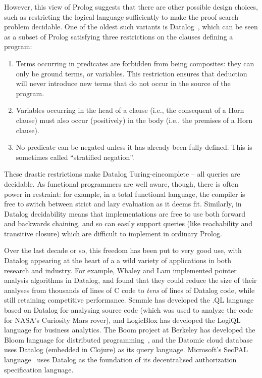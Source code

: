 However, this view of Prolog suggests that there are other possible
design choices, such as restricting the logical language sufficiently
to make the proof search problem decidable. One of the oldest such
variants is Datalog~\cite{datalog}, which can be seen as a subset of
Prolog satisfying three restrictions on the clauses defining a program:
\begin{enumerate}
\item Terms occurring in predicates are forbidden from being
  composites: they can only be ground terms, or variables. This
  restriction ensures that deduction will never introduce new terms
  that do not occur in the source of the program.
\item Variables occurring in the head of a clause (i.e., the
  consequent of a Horn clause) must also occur (positively) in the
  body (i.e., the premises of a Horn clause).
\item No predicate can be negated unless it has already been fully
  defined.  This is sometimes called ``stratified negation''.
\end{enumerate}
These drastic restrictions make Datalog Turing-eincomplete -- all
queries are decidable. As functional programmers are well aware,
though, there is often power in restraint: for example, in a total
functional language, the compiler is free to switch between strict and
lazy evaluation as it deems fit. Similarly, in Datalog decidability
means that implementations are free to use both forward and backwards
chaining, and so can easily support queries (like reachability and
transitive closure) which are difficult to implement in ordinary
Prolog.

Over the last decade or so, this freedom has been put to very good
use, with Datalog appearing at the heart of a a wild variety of
applications in both research and industry.  For example, Whaley and
Lam \cite{whaley-lam,whaley-phd} implemented pointer analysis
algorithms in Datalog, and found that they could reduce the size of
their analyses from thousands of lines of C code to \emph{tens} of
lines of Datalog code, while still retaining competitive
performance. Semmle has developed the .QL
language~\cite{semmlecode,ql-inference} based on Datalog for analysing
source code (which was used to analyze the code for NASA's Curiosity
Mars rover), and LogicBlox has developed the LogiQL~\cite{logicblox}
language for business analytics. The Boom project at Berkeley has
developed the Bloom language for distributed programming~\cite{bloom},
and the Datomic cloud database~\cite{datomic} uses Datalog (embedded
in Clojure) as its query language. Microsoft's SecPAL
language~\cite{secpal} uses Datalog as the foundation of its
decentralised authorization specification language.


